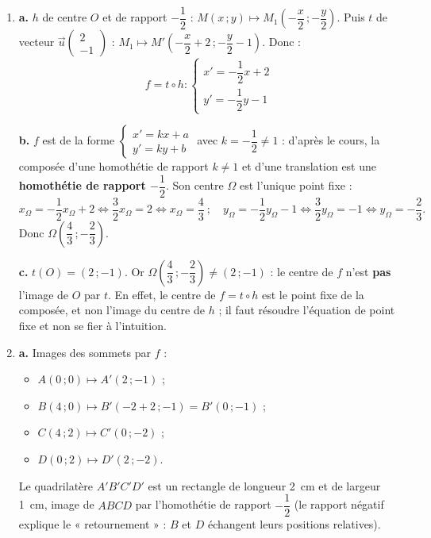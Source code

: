 \documentclass[11pt]{article}
\begin{document}
\begin{corrige}
\begin{enumerate}
\item \textbf{a.} $h$ de centre $O$ et de rapport $-\dfrac{1}{2}$ : $M(x\,;y) \mapsto M_1\left(-\dfrac{x}{2}\,;-\dfrac{y}{2}\right)$. Puis $t$ de vecteur $\vec{u}\begin{pmatrix} 2 \\ -1 \end{pmatrix}$ : $M_1 \mapsto M'\left(-\dfrac{x}{2}+2\,;-\dfrac{y}{2}-1\right)$. Donc :
\[ f = t \circ h : \begin{cases} x' = -\dfrac{1}{2}x + 2 \\[1mm] y' = -\dfrac{1}{2}y - 1 \end{cases} \]

\textbf{b.} $f$ est de la forme $\begin{cases} x' = kx + a \\ y' = ky + b \end{cases}$ avec $k = -\dfrac{1}{2} \neq 1$ : d'après le cours, la composée d'une homothétie de rapport $k \neq 1$ et d'une translation est une \textbf{homothétie de rapport $-\dfrac{1}{2}$}. Son centre $\Omega$ est l'unique point fixe :
\[ x_\Omega = -\dfrac{1}{2}x_\Omega + 2 \iff \dfrac{3}{2}x_\Omega = 2 \iff x_\Omega = \dfrac{4}{3} \ ; \quad y_\Omega = -\dfrac{1}{2}y_\Omega - 1 \iff \dfrac{3}{2}y_\Omega = -1 \iff y_\Omega = -\dfrac{2}{3}. \]
Donc $\Omega\left(\dfrac{4}{3}\,;-\dfrac{2}{3}\right)$.

\textbf{c.} $t(O) = (2\,;-1)$. Or $\Omega\left(\dfrac{4}{3}\,;-\dfrac{2}{3}\right) \neq (2\,;-1)$ : le centre de $f$ n'est \textbf{pas} l'image de $O$ par $t$. En effet, le centre de $f = t \circ h$ est le point fixe de la composée, et non l'image du centre de $h$ ; il faut résoudre l'équation de point fixe et non se fier à l'intuition.

\item \textbf{a.} Images des sommets par $f$ :
\begin{itemize}
\item $A(0\,;0) \mapsto A'(2\,;-1)$ ;
\item $B(4\,;0) \mapsto B'\left(-2+2\,;-1\right) = B'(0\,;-1)$ ;
\item $C(4\,;2) \mapsto C'(0\,;-2)$ ;
\item $D(0\,;2) \mapsto D'(2\,;-2)$.
\end{itemize}
Le quadrilatère $A'B'C'D'$ est un rectangle de longueur \SI{2}{cm} et de largeur \SI{1}{cm}, image de $ABCD$ par l'homothétie de rapport $-\dfrac{1}{2}$ (le rapport négatif explique le « retournement » : $B$ et $D$ échangent leurs positions relatives).


\end{enumerate}
\end{corrige}
\end{document}
